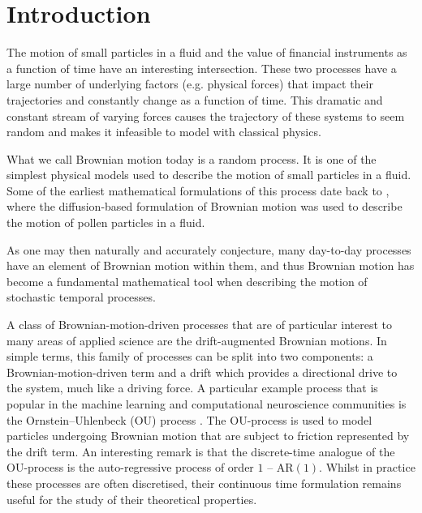 \documentclass[a4paper,12pt,twoside,openright]{report}
\theoremstyle{definition}
\begin{document}
\pagestyle{empty}
\singlespacing

\onehalfspacing

\singlespacing


\setcounter{page}{0}
\pagestyle{plain}
\tableofcontents
\listoffigures
\listoftables
\onehalfspacing


 \chapter{Introduction}
 
 The motion of small particles in a fluid and the value of financial instruments as a function of time have an interesting intersection. These two processes have a large number of underlying factors (e.g. physical forces) that impact their trajectories and constantly change as a function of time. This dramatic and constant stream of varying forces causes the trajectory of these systems to seem random and makes it infeasible to model with classical physics. 
 
 What we call Brownian motion today is a random process. It is one of the simplest physical models used to describe the motion of small particles in a fluid. Some of the earliest mathematical formulations of this process date back to \cite{einstein1905motion}, where the diffusion-based formulation of Brownian motion was used to describe the motion of pollen particles in a fluid.
 
 As one may then naturally and accurately conjecture, many day-to-day processes have an element of Brownian motion within them, and thus Brownian motion has become a fundamental mathematical tool when describing the motion of stochastic temporal processes.
 
 A class of Brownian-motion-driven processes that are of particular interest to many areas of applied science are the drift-augmented Brownian motions. In simple terms, this family of processes can be split into two components: a Brownian-motion-driven term and a drift which provides a directional drive to the system, much like a driving force. A particular example process that is popular in the machine learning and computational neuroscience communities is the Ornstein–Uhlenbeck (OU) process \citep{doob1942brownian}. The OU-process is used to model particles undergoing Brownian motion that are subject to friction represented by the drift term. An interesting remark is that the discrete-time analogue of the OU-process is the auto-regressive process of order $1$ -- $\text{AR}(1)$. Whilst in practice these processes are often discretised, their continuous time formulation remains useful for the study of their theoretical properties.
 
\end{document}
